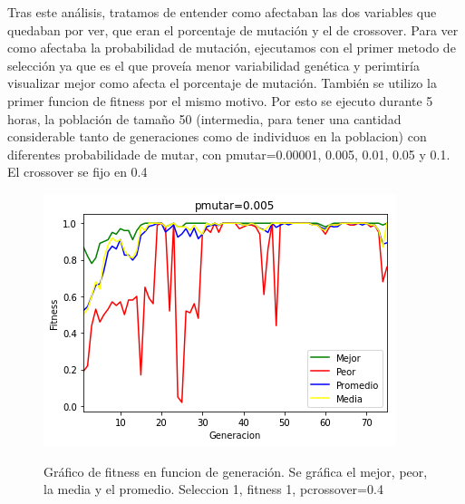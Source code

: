 \documentclass[A4paper,oneside,fleqn,11pt]{article}
\theoremstyle{definition}
\begin{document}
Tras este análisis, tratamos de entender como afectaban las dos variables que quedaban por ver, que eran el porcentaje de mutación y el de crossover. Para ver como afectaba la probabilidad de mutación, ejecutamos con el primer metodo de selección ya que es el que proveía menor variabilidad genética y perimtiría visualizar mejor como afecta el porcentaje de mutación. También se utilizo la primer funcion de fitness por el mismo motivo. Por esto se ejecuto durante 5 horas, la población de tamaño 50 (intermedia, para tener una cantidad considerable tanto de generaciones como de individuos en la poblacion) con diferentes probabilidade de mutar, con pmutar=0.00001, 0.005, 0.01, 0.05 y 0.1. El crossover se fijo en 0.4


\begin{figure}[H]
	\captionsetup[subfigure]{position=b}
	\centering
		{\includegraphics[width=0.3\linewidth]{muta1.png}}
	\caption{Gráfico de fitness en funcion de generación. Se gráfica el mejor, peor, la media y el promedio. Seleccion 1, fitness 1, pcrossover=0.4}
\end{figure}
\end{document}
